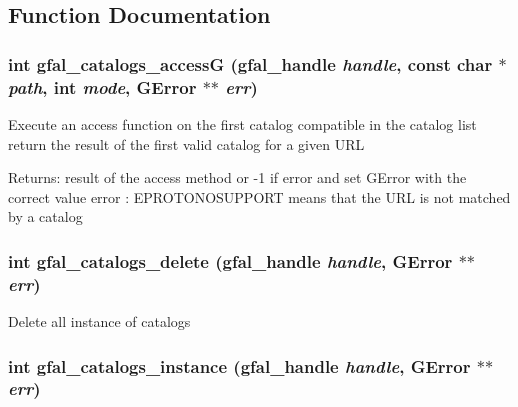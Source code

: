 \subsection{Function Documentation}
\subsubsection{\setlength{\rightskip}{0pt plus 5cm}int gfal\_\-catalogs\_\-access\-G (gfal\_\-handle {\em handle}, const char $\ast$ {\em path}, int {\em mode}, GError $\ast$$\ast$ {\em err})}\label{gfal__common__catalog_8h_4fd85b35f2134b73207c12b54e85959d}


Execute an access function on the first catalog compatible in the catalog list return the result of the first valid catalog for a given URL \begin{Desc}
\item[Returns:]result of the access method or -1 if error and set GError with the correct value error : EPROTONOSUPPORT means that the URL is not matched by a catalog \end{Desc}
\subsubsection{\setlength{\rightskip}{0pt plus 5cm}int gfal\_\-catalogs\_\-delete (gfal\_\-handle {\em handle}, GError $\ast$$\ast$ {\em err})}\label{gfal__common__catalog_8h_405974336e7b4ebaafeea02577d7d4d5}


Delete all instance of catalogs 
\subsubsection{\setlength{\rightskip}{0pt plus 5cm}int gfal\_\-catalogs\_\-instance (gfal\_\-handle {\em handle}, GError $\ast$$\ast$ {\em err})}\label{gfal__common__catalog_8h_d272f75eb549a72064524ecce3c25fe7}



